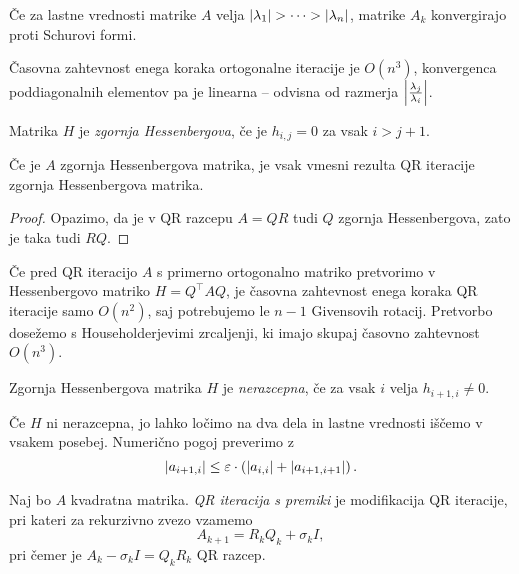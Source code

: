 \begin{posledica}
Če za lastne vrednosti matrike $A$ velja
$\left\lvert \lambda_1\right\rvert > \dots > \left\lvert \lambda_n\right\rvert$, matrike $A_k$
konvergirajo proti Schurovi formi.
\end{posledica}

\obvs

\begin{opomba}
Časovna zahtevnost enega koraka ortogonalne iteracije je $O(n^3)$,
konvergenca poddiagonalnih elementov pa je linearna -- odvisna od
razmerja $\left\lvert \frac{\lambda_j}{\lambda_i}\right\rvert$.
\end{opomba}

\begin{definicija}
Matrika $H$ je
\emph{zgornja Hessenbergova},
če je $h_{i,j} = 0$ za vsak $i > j+1$.
\end{definicija}

\begin{trditev}
Če je $A$ zgornja Hessenbergova matrika, je vsak vmesni rezulta QR
iteracije zgornja Hessenbergova matrika.
\end{trditev}

\begin{proof}
Opazimo, da je v QR razcepu $A = QR$ tudi $Q$ zgornja
Hessenbergova, zato je taka tudi $RQ$.
\end{proof}

\begin{opomba}
Če pred QR iteracijo $A$ s primerno ortogonalno matriko pretvorimo
v Hessenbergovo matriko $H = Q^\top A Q$, je časovna zahtevnost
enega koraka QR iteracije samo $O(n^2)$, saj potrebujemo le $n-1$
Givensovih rotacij. Pretvorbo dosežemo s Householderjevimi
zrcaljenji, ki imajo skupaj časovno zahtevnost $O(n^3)$.
\end{opomba}

\begin{definicija}
Zgornja Hessenbergova matrika $H$ je
\emph{nerazcepna},
če za vsak $i$ velja $h_{i+1,i} \ne 0$.
\end{definicija}

\begin{opomba}
Če $H$ ni nerazcepna, jo lahko ločimo na dva dela in lastne
vrednosti iščemo v vsakem posebej. Numerično pogoj preverimo z
\[
\left\lvert a_{i+1,i}\right\rvert \leq
\varepsilon \cdot \left(\left\lvert a_{i,i}\right\rvert + \left\lvert a_{i+1,i+1}\right\rvert\right).
\]
\end{opomba}

\begin{definicija}
Naj bo $A$ kvadratna matrika.
\emph{QR iteracija s premiki}
je modifikacija QR iteracije, pri kateri za rekurzivno zvezo
vzamemo
\[
A_{k+1} = R_k Q_k + \sigma_k I,
\]
pri čemer je $A_k - \sigma_k I = Q_k R_k$ QR razcep.
\end{definicija}

